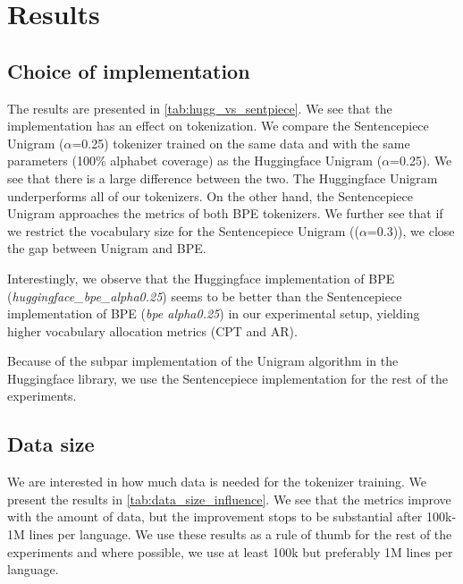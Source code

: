 \section{Results}

\subsection{Choice of implementation}
\label{sec:implementation}



The results are presented in \autoref{tab:hugg_vs_sentpiece}. We see that the implementation has an effect on tokenization. We compare the Sentencepiece Unigram ($\alpha$=0.25) tokenizer trained on the same data and with the same parameters (100\% alphabet coverage) as the Huggingface Unigram ($\alpha$=0.25). We see that there is a large difference between the two. The Huggingface Unigram underperforms all of our tokenizers. On the other hand, the Sentencepiece Unigram approaches the metrics of both BPE tokenizers. We further see that if we restrict the vocabulary size for the Sentencepiece Unigram (($\alpha$=0.3)), we close the gap between Unigram and BPE. 

Interestingly, we observe that the Huggingface implementation of BPE (\textit{huggingface\_bpe\_alpha0.25}) seems to be better than the Sentencepiece implementation of BPE (\textit{bpe alpha0.25}) in our experimental setup, yielding higher vocabulary allocation metrics (CPT and AR).

Because of the subpar implementation of the Unigram algorithm in the Huggingface library, we use the Sentencepiece implementation for the rest of the experiments.

\subsection{Data size}
\label{sec:data_size}



We are interested in how much data is needed for the tokenizer training. We present the results in \autoref{tab:data_size_influence}. We see that the metrics improve with the amount of data, but the improvement stops to be substantial after 100k-1M lines per language. We use these results as a rule of thumb for the rest of the experiments and where possible, we use at least 100k but preferably 1M lines per language.

